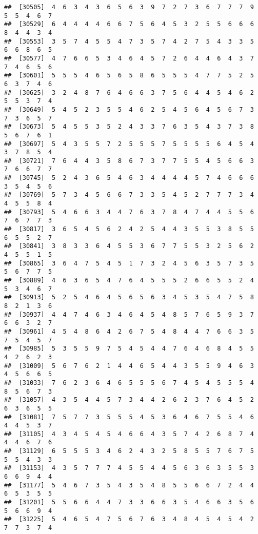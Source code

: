 \documentclass[
]{book}
\begin{document}
\begin{verbatim}
##  [30505]  4  6  3  4  3  6  5  6  3  9  7  2  7  3  6  7  7  7  9  5  5  4  6  7
##  [30529]  6  4  4  4  4  6  6  7  5  6  4  5  3  2  5  5  6  6  6  8  4  4  3  4
##  [30553]  3  5  7  4  5  5  4  7  3  5  7  4  2  7  5  4  3  3  5  6  6  8  6  5
##  [30577]  4  7  6  6  5  3  4  6  4  5  7  2  6  4  4  6  4  3  7  7  4  6  5  6
##  [30601]  5  5  5  4  6  5  6  5  8  6  5  5  5  4  7  7  5  2  5  6  3  7  4  6
##  [30625]  3  2  4  8  7  6  4  6  6  3  7  5  6  4  4  5  4  6  2  5  5  3  7  4
##  [30649]  5  4  5  2  3  5  5  4  6  2  5  4  5  6  4  5  6  7  3  7  3  6  5  7
##  [30673]  5  4  5  5  3  5  2  4  3  3  7  6  3  5  4  3  7  3  8  5  6  7  6  1
##  [30697]  5  4  3  5  5  7  2  5  5  5  7  5  5  5  5  6  4  5  4  3  7  8  5  4
##  [30721]  7  6  4  4  3  5  8  6  7  3  7  7  5  5  4  5  6  6  3  7  6  6  7  7
##  [30745]  5  2  4  3  6  5  4  6  3  4  4  4  4  5  7  4  6  6  6  3  5  4  5  6
##  [30769]  5  7  3  4  5  6  6  7  3  3  5  4  5  2  7  7  7  3  4  4  5  5  8  4
##  [30793]  5  4  6  6  3  4  4  7  6  3  7  8  4  7  4  4  5  5  6  7  6  7  7  3
##  [30817]  3  6  5  4  5  6  2  4  2  5  4  4  3  5  5  3  8  5  5  6  5  5  2  7
##  [30841]  3  8  3  3  6  4  5  5  3  6  7  7  5  5  3  2  5  6  2  4  5  5  1  5
##  [30865]  3  6  4  7  5  4  5  1  7  3  2  4  5  6  3  5  7  3  5  5  6  7  7  5
##  [30889]  4  6  3  6  5  4  7  6  4  5  5  5  2  6  6  5  5  2  4  5  3  4  6  7
##  [30913]  5  2  5  4  6  4  5  6  5  6  3  4  5  3  5  4  7  5  8  8  2  1  3  6
##  [30937]  4  4  7  4  6  3  4  6  4  5  4  8  5  7  6  5  9  3  7  6  6  3  2  7
##  [30961]  4  5  4  8  6  4  2  6  7  5  4  8  4  4  7  6  6  3  5  7  5  4  5  7
##  [30985]  5  3  5  5  9  7  5  4  5  4  4  7  6  4  6  8  4  5  5  4  2  6  2  3
##  [31009]  5  6  7  6  2  1  4  4  6  5  4  4  3  5  5  9  4  6  3  4  5  6  6  5
##  [31033]  7  6  2  3  6  4  6  5  5  5  6  7  4  5  4  5  5  5  4  8  5  6  7  3
##  [31057]  4  3  5  4  4  5  7  3  4  4  2  6  2  3  7  6  4  5  2  6  3  6  5  5
##  [31081]  7  5  7  7  3  5  5  5  4  5  3  6  4  6  7  5  5  4  6  4  4  5  3  7
##  [31105]  4  3  4  5  4  5  4  6  6  4  3  5  7  4  2  6  8  7  4  4  4  6  7  6
##  [31129]  6  5  5  5  3  4  6  2  4  3  2  5  8  5  5  7  6  7  5  5  5  4  3  3
##  [31153]  4  3  5  7  7  7  4  5  5  4  4  5  6  3  6  3  5  5  3  6  6  9  4  4
##  [31177]  5  4  6  7  3  5  4  3  5  4  8  5  5  6  6  7  2  4  4  6  5  3  5  5
##  [31201]  5  5  6  6  4  4  7  3  3  6  6  3  5  4  6  6  3  5  6  5  6  6  9  4
##  [31225]  5  4  6  5  4  7  5  6  7  6  3  4  8  4  5  4  5  4  2  7  7  3  7  4

\end{verbatim}
\end{document}
